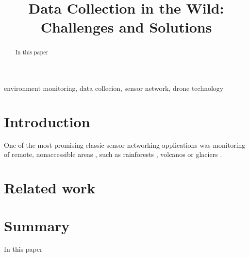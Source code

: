 \documentclass[conference]{IEEEtran}
\begin{document}
\title{Data Collection in the Wild: Challenges and Solutions}

\author{
\and
{}
\and
{}
}

\maketitle

\begin{abstract}
In this paper 
\end{abstract}

\begin{IEEEkeywords}
environment monitoring, data collecion, sensor network, drone technology
\end{IEEEkeywords}

\section{Introduction}
One of the most promising classic sensor networking applications was monitoring
of remote, nonaccessible areas \cite{corke2010}, such as rainforests \cite{wark2008, cama2013}, volcanos \cite{werner2006, song2009} or glaciers \cite{martinez2004, martinez2005}.

\section{Related work}



\section{Summary}

In this paper 



\end{document}
